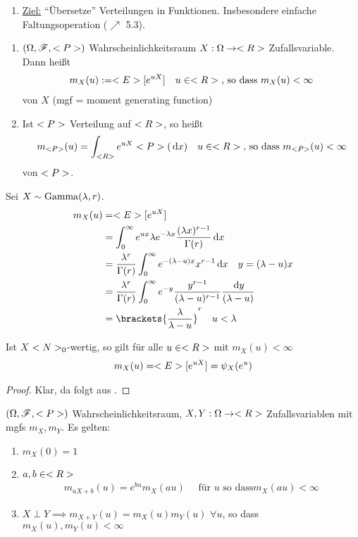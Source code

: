 ﻿\begin{enumerate}[label=]
	\item \ul{Ziel:} ``Übersetze'' Verteilungen in Funktionen. Insbesondere einfache Faltungsoperation ($\nearrow$ 5.3). %
\end{enumerate}
\begin{definition}
	\begin{enumerate}
		\item $(\O,\F,\P)$ Wahrscheinlichkeitsraum $X: \O \to \R$ Zufallsvariable. Dann heißt
		\begin{align*}
			m_X(u) := \E[e^{uX}] \quad u\in \R\text{, so dass } m_X(u) < \infty
		\end{align*}
		 von $X$ (mgf = moment generating function)
		\item Ist $\P$ Verteilung auf $\R$, so heißt
		\begin{align*}
			m_{\P}(u) = \int_{\R}e^{uX} \P(\d x) \quad u \in \R\text{, so dass } m_{\P}(u) < \infty
		\end{align*}
		 von $\P$.
	\end{enumerate}
\end{definition}
\begin{example}
	Sei $X \sim \Gam(\lambda,r)$.
	\begin{align*}
		m_X(u) &= \E[e^{uX}]\\
		&= \int_{0}^{\infty} e^{ux}\lambda e^{-\lambda x}\frac{(\lambda x)^{r-1}}{\Gamma(r)}\d x\\
		&= \frac{\lambda^r}{\Gamma(r)} \int_{0}^{\infty}e^{-(\lambda-u)x}x^{r-1}\d x \quad y= (\lambda-u)x\\
		&= \frac{\lambda^r}{\Gamma(r)}\int_0^{\infty} e^{-y}\frac{y^{r-1}}{(\lambda-u)^{r-1}}\frac{\d y}{(\lambda-u)}\\
		&= \brackets{\frac{\lambda}{\lambda-u}}^r \quad u < \lambda
	\end{align*}
\end{example}
\begin{lemma}
	Ist $X$ $\N_0$-wertig, so gilt für alle $u \in \R$ mit $m_X(u) < \infty$
	\begin{align*}
		m_X(u) = \E[e^{uX}] = \psi_X(e^u)
	\end{align*}
\end{lemma}
\begin{proof}
	Klar, da folgt aus .
\end{proof}
\begin{proposition}
	$(\O,\F,\P)$ Wahrscheinlichkeitsraum, $X,Y: \O \to \R$ Zufallsvariablen mit mgfs $m_X,m_Y$. Es gelten:
	\begin{enumerate}
		\item $m_X(0) = 1$
		\item $a,b \in \R$
		\begin{align*}
			m_{aX+b}(u) = e^{bu}m_X(au) \quad \text{ für } u \text{ so dass} m_X(au) < \infty
		\end{align*}
		\item $X \perp Y \implies m_{X+Y}(u) = m_X(u)m_Y(u)$ $\forall u$, so dass $m_X(u), m_Y(u) < \infty$ 
	\end{enumerate}
\end{proposition}
